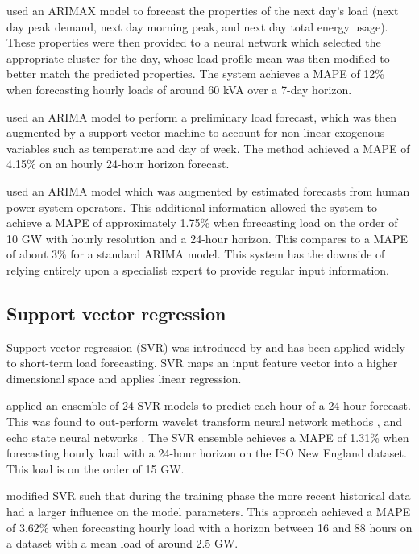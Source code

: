 \citet{Bennett2014} used an ARIMAX model to forecast the properties of the next day's load (next day peak demand, next day morning peak, and next day total energy usage). These properties were then provided to a neural network which selected the appropriate cluster for the day, whose load profile mean was then modified to better match the predicted properties.
The system achieves a MAPE of 12\% when forecasting hourly loads of around 60 kVA over a 7-day horizon.

\citet{Karthika2017} used an ARIMA model to perform a preliminary load forecast, which was then augmented by a support vector machine to account for non-linear exogenous variables such as temperature and day of week.
The method achieved a MAPE of 4.15\% on an hourly 24-hour horizon forecast.

\citet{Amjady2001} used an ARIMA model which was augmented by estimated forecasts from human power system operators.
This additional information allowed the system to achieve a MAPE of approximately 1.75\% when forecasting load on the order of 10 GW with hourly resolution and a 24-hour horizon.
This compares to a MAPE of about 3\% for a standard ARIMA model.
This system has the downside of relying entirely upon a specialist expert to provide regular input information.

\subsection{Support vector regression}
Support vector regression (SVR) was introduced by \citet{Drucker1996} and has been applied widely to short-term load forecasting.
SVR maps an input feature vector into a higher dimensional space and applies linear regression.

\citet{Ceperic2013} applied an ensemble of 24 SVR models to predict each hour of a 24-hour forecast.
This was found to out-perform wavelet transform neural network methods \cite{RochaReis2005}\cite{AMJADY2009}, and echo state neural networks \cite{Deihimi2012}.
The SVR ensemble achieves a MAPE of 1.31\% when forecasting hourly load with a 24-hour horizon on the ISO New England dataset.
This load is on the order of 15 GW.

\citet{Elattar2010} modified SVR such that during the training phase the more recent historical data had a larger influence on the model parameters.
This approach achieved a MAPE of 3.62\% when forecasting hourly load with a horizon between 16 and 88 hours on a dataset with a mean load of around 2.5 GW.


